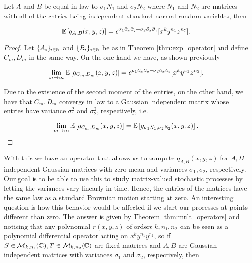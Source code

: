     \begin{corollary}
        Let $A$ and $B$ be equal in law to $\sigma_1 N_1$ and $\sigma_2 N_2$ where $N_1$ and $N_2$ are matrices with all of the entries being independent standard normal random variables, then
        
        \begin{equation*}
            \mathbb E \left[  q_{A,B}(x,y,z)  \right] = e^{\sigma_1 \partial_x \partial_y + \sigma_2 \partial_x \partial_z}[x^k y^{n_1} z^{n_2}].
        \end{equation*}
        \end{corollary}

        \begin{proof}
            Let $\{A_i\}_{i\in \mathbb N}$ and $\{B_i\}_{i\in \mathbb N}$ be as in Theorem \ref{thm:exp_operator} and define $C_m, D_m$ in the same way. On the one hand we have, as shown previously

            \begin{equation*}
                \lim_{m\to \infty} \mathbb E \left[  q_{C_m,D_m}(x,y,z) \right] =  e^{\sigma_1 \partial_x \partial_y + \sigma_2 \partial_x \partial_z}[x^k y^{n_1} z^{n_2}].
            \end{equation*}

            Due to the existence of the second moment of the entries, on the other hand, we have that $C_m, D_m$ converge in law to a Gaussian independent matrix whose entries have variance $\sigma_1^2$ and $\sigma_2^2$, respectively, i.e.

            \begin{equation*}
                \lim_{m\to \infty} \mathbb E \left[  q_{C_m,D_m}(x,y,z) \right] = \mathbb E \left[  q_{\sigma_1 N_1, \sigma_2 N_2}(x,y,z) \right].
            \end{equation*}        
        \end{proof}

        With this we have an operator that allows us to compute $q_{A,B}(x,y,z)$ for $A,B$ independent Gaussian matrices with zero mean and variances $\sigma_1,\sigma_2$, respectively. Our goal is to be able to use this to study matrix-valued stochastic processes by letting the variances vary linearly in time. Hence, the entries of the matrices have the same law as a standard Brownian motion starting at zero. An interesting question is how this behavior would be affected if we start our processes at points different than zero. The answer is given by Theorem \ref{thm:mult_operators} and noticing that any polynomial $r(x,y,z)$ of orders $k,n_1,n_2$ can be seen as a polynomial differential operator acting on $x^ky^{n_1}y^{n_2}$, so if $S\in \mathcal M_{k,n_1}(\mathbb C),T\in \mathcal M_{k,n_2}(\mathbb C)$ are fixed matrices and $A, B$ are Gaussian independent matrices with variances $\sigma_1$ and $\sigma_2$, respectively, then

